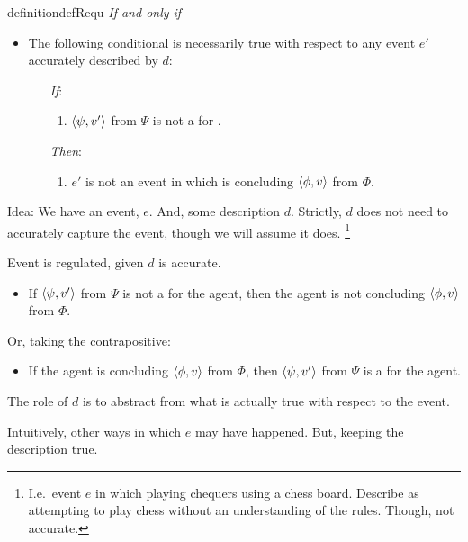 \begin{note}
\begin{restatable}[A \requ{0}]{definition}{defRequ}
    \emph{If and only if}

    \begin{itemize}
    \item
      The following conditional is necessarily true with respect to any event \(e'\) accurately described by \(d\):
      \begin{itemize}
      \item[\emph{If}:]
        \begin{enumerate}[label=\alph*., ref=(\alph*), series=requDefSeries]
        \item
          \label{def:requ:nK}
          \(\langle \psi, v' \rangle\) from \(\Psi\) is not a \fc{} for \vAgent{}.
        \end{enumerate}
      \item[\emph{Then}:]
        \begin{enumerate}[label=\alph*., ref=(\alph*), resume*=requDefSeries]
        \item
          \label{def:requ:nC}
          \(e'\) is not an event in which \vAgent{} is concluding \(\langle \phi, v \rangle\) from \(\Phi\).
        \end{enumerate}
      \end{itemize}
    \end{itemize}
    \vspace{-\baselineskip}
  \end{restatable}
\end{note}

\begin{note}
  Idea:
  We have an event, \(e\).
  And, some description \(d\).
  Strictly, \(d\) does not need to accurately capture the event, though we will assume it does.%
  \footnote{
    I.e.\ event \(e\) in which playing chequers using a chess board.
    Describe as attempting to play chess without an understanding of the rules.
    Though, not accurate.
  }

  Event is regulated, given \(d\) is accurate.

  \begin{itemize}
  \item
    If \(\langle \psi, v' \rangle\) from \(\Psi\) is not a \fc{} for the agent, then the agent is not concluding \(\langle \phi, v \rangle\) from \(\Phi\).
  \end{itemize}

  Or, taking the contrapositive:

  \begin{itemize}
  \item
    If the agent is concluding \(\langle \phi, v \rangle\) from \(\Phi\), then \(\langle \psi, v' \rangle\) from \(\Psi\) is a \fc{} for the agent.
  \end{itemize}

  The role of \(d\) is to abstract from what is actually true with respect to the event.

  Intuitively, other ways in which \(e\) may have happened.
  But, keeping the description true.
\end{note}

